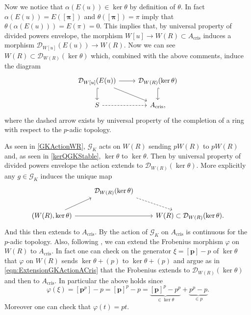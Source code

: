 \begin{rem}[]
	Now we notice that $\alpha(E(u)) \in \ker\theta$
	by definition of $\theta$.
	In fact $\alpha(E(u)) = E(\left[ \boldsymbol\pi \right])$
	and $\theta([\boldsymbol\pi]) = \pi$ imply that $\theta(\alpha(E(u))) = E(\pi) = 0$.
	This implies that, by universal property of divided powers envelope,
	the morphism $W[u] \to W(R) \subset A_{\mathrm{cris}}$
	induces a morphism $\mathcal{D}_{W[u]}(E(u)) \to W(R)$.
	Now we can see $W(R) \subset \mathcal{D}_{W(R)}(\ker\theta)$
	which, combined with the above comments, induce the diagram
	\begin{equation*}
	\begin{tikzcd}
		\mathcal{D}_{W[u]}(E(u)) \arrow[r, "", rightarrow] 
		\arrow[d, "", hookrightarrow] 
		\arrow[rd, "", rightarrow] &
		\mathcal{D}_{W(R)}(\ker\theta) \arrow[d, "", hookrightarrow] \\
		S \arrow[r, "", dashrightarrow] &
		A_{\mathrm{cris}}
	,\end{tikzcd}
	\end{equation*}
	where the dashed arrow exists by universal property of the completion
	of a ring with respect to the $p$-adic topology.
\end{rem}


\begin{rem}[]
	As seen in \cref{GKActionWR}, $\mathscr{G}_K$ acts on $W(R)$ sending $pW(R)$ to $pW(R)$
	and, as seen in \cref{kerQGKStable}, $\ker\theta$ to $\ker\theta$.
	Then by universal property of divided powers envelope the action extends to
	$\mathcal{D}_{W(R)}(\ker\theta)$.
	More explicitly any $g \in \mathscr{G}_K$ induces the unique map
	\begin{equation}\label{eqn:ExtensionGKActionACris}
	\begin{tikzcd}
		&
		\mathcal{D}_{W(R)}(\ker\theta)
		\arrow[rd, "", dashrightarrow,
		start anchor=south east] & \\
		\left(W(R), \ker\theta\right) \arrow[ru, "", rightarrow,
		end anchor=south west] 
		\arrow[rr, "", rightarrow] & &
		W(R) \subset \mathcal{D}_{W(R)}(\ker\theta) 
	.\end{tikzcd}
	\end{equation}
	And this then extends to $A_{\mathrm{cris}}$.
	By {\cite[Proposition 9.1.2]{Brinon}} the action
	of $\mathscr{G}_K$ on $A_{\mathrm{cris}}$ is continuous
	for the $p$-adic topology.
	Also, following {\cite[Lemmas 9.1.7-9.1.8]{Brinon}},
	we can extend the Frobenius morphism $\varphi$ on $W(R)$ to 
	$A_{\mathrm{cris}}$.
	In fact one can check on the generator $\xi = [\mathbf{p}] - p$
	of $\ker \theta$ that $\varphi$ on $W(R)$ sends $\ker\theta + (p)$ to
	$\ker\theta + (p)$ and argue as in \cref{eqn:ExtensionGKActionACris}
	that the Frobenius extends to $\mathcal{D}_{W(R)}(\ker\theta)$
	and then to $A_{\mathrm{cris}}$.
	In particular the above holds since
	\begin{equation*}
		\varphi(\xi) = [\mathbf{p}^p] - p =
		[\mathbf{p}]^p - p =
		\underbrace{[\mathbf{p}]^p - p^p}_{\in \ker\theta} + 
		\underbrace{p^p - p}_{\in p}
	.\end{equation*}
	Moreover one can check that $\varphi(t) = pt$.
\end{rem}


